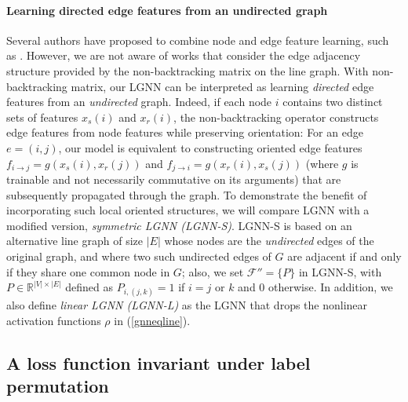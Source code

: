 \documentclass{article} \usepackage{iclr2019_conference,times}
\begin{document}
\paragraph{Learning directed edge features from an undirected graph} 
Several authors have proposed to combine node and edge feature learning, such as \citep{battaglia2016interaction, kearnes2016molecular, gilmer2017neural, velickovic2017graph}.
However, we are not aware of works that consider the edge adjacency structure provided by the non-backtracking matrix on the line graph. 
With non-backtracking matrix, our LGNN can be interpreted as learning \emph{directed} edge features from an \emph{undirected} graph. Indeed, if each node $i$ contains two distinct sets of features $x_s(i)$ and $x_r(i)$, the non-backtracking operator constructs edge features from node features while preserving orientation: For an edge $e=(i,j)$, our model is equivalent to constructing oriented edge features $f_{i\to j} = g(x_s(i), x_r(j))$ and $f_{j \to i} = g(x_r(i), x_s(j))$ (where $g$ is trainable and not necessarily commutative on its arguments) that are subsequently propagated through the graph. 
To demonstrate the benefit of incorporating such local oriented structures, we will compare LGNN with a modified version, \textit{symmetric LGNN (LGNN-S)}. LGNN-S is based on an alternative line graph of size $|E|$ whose nodes are the \textit{undirected} edges of the original graph, and where two such undirected edges of $G$ are adjacent if and only if they share one common node in $G$; also, we set $\mathcal{F}'' = \{ P \}$ in LGNN-S, with $P \in \mathbb{R}^{|V| \times |E|}$ defined as $P_{i, (j, k)} = 1$ if $i = j$ or $k$ and $0$ otherwise. In addition, we also define \textit{linear LGNN (LGNN-L)} as the LGNN that drops the nonlinear activation functions $\rho$ in (\ref{gnneqline}).
\subsection{A loss function invariant under label permutation}
\label{permutationlosssec}
\end{document}
